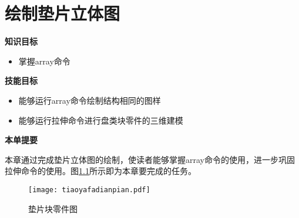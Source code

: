 \chapter{绘制垫片立体图}
{\bfseries 知识目标}
\begin{itemize}
\item 掌握array命令
\end{itemize}

{\bfseries 技能目标}
\begin{itemize}
\item 能够运行array命令绘制结构相同的图样
\item 能够运行拉伸命令进行盘类块零件的三维建模
\end{itemize}

{\bfseries 本单提要}

本章通过完成垫片立体图的绘制，使读者能够掌握array命令的使用，进一步巩固拉伸命令的使用。图\ref{fig:tiaoyafadianpian}所示即为本章要完成的任务。
\noindent
\begin{figure}[htbp]
\centering
\texttt{[image: tiaoyafadianpian.pdf]}
\caption{垫片块零件图}\label{fig:tiaoyafadianpian}
\end{figure}

\endinput